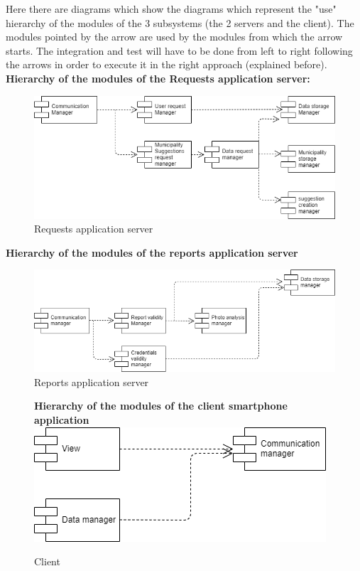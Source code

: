 \documentclass[titlepage]{article}
\begin{document}
Here there are diagrams which show the diagrams which represent the "use" hierarchy of the modules of the 3 subsystems (the 2 servers and the client). The modules pointed by the arrow are used by the modules from which the arrow starts. The integration and test will have to be done from left to right following the arrows in order to execute it in the right approach (explained before).\\

\textbf{Hierarchy of the modules of the Requests application server:}

\begin{figure}[h]
\includegraphics[scale=0.5]{Diagrams/Request application servers.png}
	\caption{Requests application server}
\end{figure}
\FloatBarrier

\textbf{Hierarchy of the modules of the reports application server\\}
\begin{figure}[h]
\includegraphics[scale=0.5]{Diagrams/report application server.png}
	\caption{Reports application server}
\end{figure}
\FloatBarrier


\begin{figure}[h]
\textbf{Hierarchy of the modules of the client smartphone application}
\includegraphics[scale=0.5]{Diagrams/Client.png}
	\caption{Client}
\end{figure}
\FloatBarrier
\end{document}
